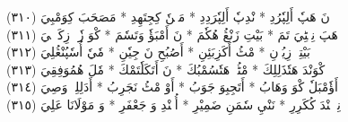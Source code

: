 \documentclass[a4paper, 10pt]{report}
\begin{document}
\begin{center}
\textarabic{(٣١٠) \textcolor{mygreen}{نَ هَپٗ أَلِپٗرُدِ  * نْدِپٗ أَلِپٗرَدِدِ  * مَنٖنٗ كِجِتَهِدِ  * مَصَحَبَ كِوَمْبِيَ }} 
\\[5mm] 

\textarabic{(٣١١) \textcolor{mygreen}{هَپَ نِمٖٹِيَ تَمَ  * بَيْتِ زَنْڠُ هُكٗمَ  * نَ أَمْبَؤٗ وَتَسٗمَ  * كْوَ زٗتٖ زِكَوٖلٖيَ }} 
\\[5mm] 

\textarabic{(٣١٢) \textcolor{mygreen}{بَيْتِزٖ زِيُوٖنِ  * مْٹُ أَكَزِبَئِنِ  * أَصُبُحِ نَ جِيٗنِ  * مٗيٗ أُسٗپُنْڠُلِيَ }} 
\\[5mm] 

\textarabic{(٣١٣) \textcolor{mygreen}{كْوَنْدَ هَتٗذَلِلِكَ  * مْٹُيٖ هَتٗسُمْبُكَ  * نَ أَتَكَلٗتَمْكَ  * مٗلَ هُمُوَفِقِيَ }} 
\\[5mm] 

\textarabic{(٣١٤) \textcolor{mygreen}{أَؤٗمْبَلٗ كْوَ وَهَابُ  * أَتَجِبِوَ جَوَبُ  * أَوْ مْٹُ نَجَرِبُ  * أَدَلِلِشٖ وَصِيَ }} 
\\[5mm] 

\textarabic{(٣١٥) \textcolor{mygreen}{نِمٖپٖنْدَ كُكَرِرِ  * نَنْيِ سٗمَنِ ضَمِيْرِ  * أُتٖنْدِ وَ جَعْفَرِ  * وَ مَوْلَانَا عَلِيَ }} 
\\[5mm] 

\end{center} 

\renewcommand{\bibname}{References} 
\begingroup 
\printbibliography 
\endgroup 
\end{document}
